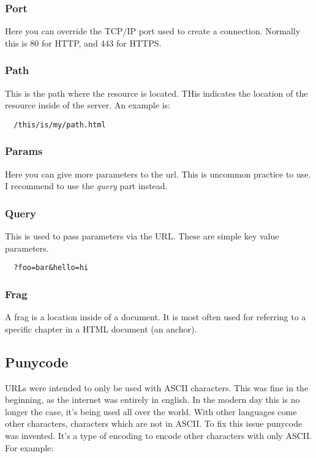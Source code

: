 \subsubsection{Port}
Here you can override the TCP/IP port used to create a connection.
Normally this is 80 for HTTP, and 443 for HTTPS\@.

\subsubsection{Path}
This is the path where the resource is located.
THis indicates the location of the resource inside of the server.
An example is:

\begin{verbatim}
  /this/is/my/path.html
\end{verbatim}

\subsubsection{Params}
Here you can give more parameters to the url.
This is uncommon practice to use.
I recommend to use the {\it query} part instead.

\subsubsection{Query}
This is used to pass parameters via the URL\@.
These are simple key value parameters.

\begin{verbatim}
  ?foo=bar&hello=hi
\end{verbatim}

\subsubsection{Frag}
A frag is a location inside of a document.
It is most often used for referring to a specific chapter in a HTML document (an anchor).

\subsection{Punycode}
URLs were intended to only be used with ASCII characters.
This was fine in the beginning, as the internet was entirely in english.
In the modern day this is no longer the case, it's being used all over the world.
With other languages come other characters, characters which are not in ASCII\@.
To fix this issue punycode was invented.
It's a type of encoding to encode other characters with only ASCII\@.
For example:

